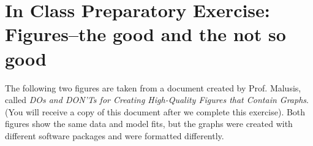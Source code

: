 \documentclass[12pt,letterpaper]{article}
\begin{document}
\section *{In Class Preparatory Exercise: Figures--the good and the not so good}
The following two figures are taken from a document created by Prof. Malusis, called \emph{DOs and DON’Ts for Creating High-Quality Figures that Contain Graphs}.   (You will receive a copy of this document after we complete this exercise).  Both figures show the same data and model fits, but the graphs were created with different software packages and were formatted differently.\\

\pagebreak

%


%  
%
%        
\end{document}
